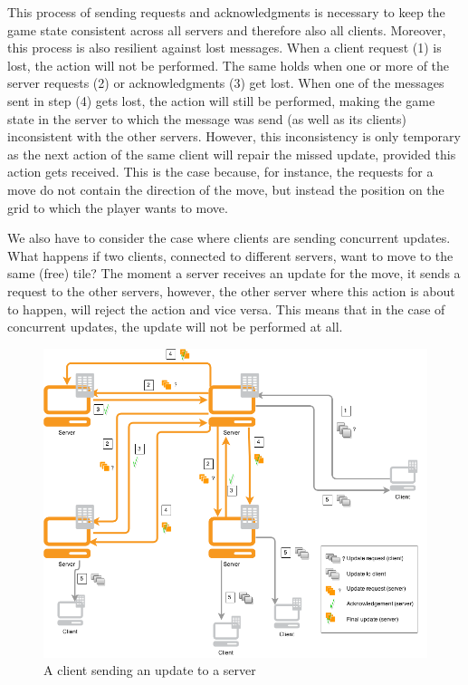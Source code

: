 This process of sending requests and acknowledgments is necessary to keep the game state consistent across all servers and therefore also all clients. 
Moreover, this process is also resilient against lost messages. 
When a client request (1) is lost, the action will not be performed. 
The same holds when one or more of the server requests (2) or acknowledgments (3) get lost. 
When one of the messages sent in step (4) gets lost, the action will still be performed, making the game state in the server to which the message was send (as well as its clients) inconsistent with the other servers. 
However, this inconsistency is only temporary as the next action of the same client will repair the missed update, provided this action gets received. 
This is the case because, for instance, the requests for a move do not contain the direction of the move, but instead the position on the grid to which the player wants to move.

We also have to consider the case where clients are sending concurrent updates. 
What happens if two clients, connected to different servers, want to move to the same (free) tile? 
The moment a server receives an update for the move, it sends a request to the other servers, however, the other server where this action is about to happen, will reject the action and vice versa. 
This means that in the case of concurrent updates, the update will not be performed at all.

\begin{figure}[h!]
  \centering
    \includegraphics[width=\textwidth]{diagrams/game-update}
    
  \caption{A client sending an update to a server}
  \label{fig:update_diagram}
\end{figure}

